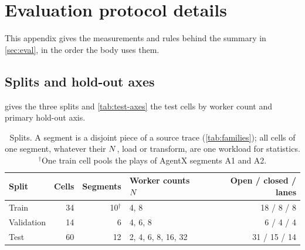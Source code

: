 %

\section{Evaluation protocol details}
\label{app:protocol}

This appendix gives the measurements and rules behind the summary in \cref{sec:eval}, in the order
the body uses them.

\subsection{Splits and hold-out axes}

 gives the three splits and \cref{tab:test-axes} the test cells by worker count and
primary hold-out axis.

\begin{table}[tbp]
  \centering\small
  \caption{Splits. A segment is a disjoint piece of a source trace (\cref{tab:families}); all cells
    of one segment, whatever their $N$, load or transform, are one workload for statistics.
    $^{\dagger}$One train cell pools the plays of AgentX segments A1 and A2.}
  \label{tab:splits}
  \begin{tabular}{@{}lrrlr@{}}
    \toprule
    Split & Cells & Segments & Worker counts $N$ & Open / closed / lanes \\
    \midrule
    Train      & 34 & 10$^{\dagger}$ & 4, 8               & 18 / 8 / 8 \\
    Validation & 14 & 6              & 4, 6, 8            & 6 / 4 / 4 \\
    Test       & 60 & 12             & 2, 4, 6, 8, 16, 32 & 31 / 15 / 14 \\
    \bottomrule
  \end{tabular}
\end{table}

